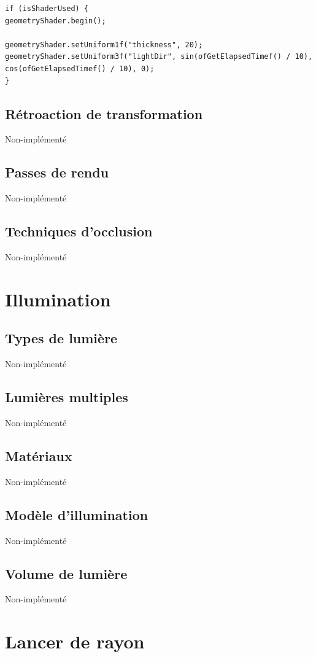 \begin{lstlisting}
if (isShaderUsed) {
geometryShader.begin();

geometryShader.setUniform1f("thickness", 20);
geometryShader.setUniform3f("lightDir", sin(ofGetElapsedTimef() / 10), cos(ofGetElapsedTimef() / 10), 0);
}
\end{lstlisting}

\subsection{Rétroaction de transformation}
Non-implémenté

\subsection{Passes de rendu}
Non-implémenté

\subsection{Techniques d'occlusion}
Non-implémenté


\pagebreak
\section{Illumination}
\subsection{Types de lumière}
Non-implémenté

\subsection{Lumières multiples}
Non-implémenté

\subsection{Matériaux}
Non-implémenté

\subsection{Modèle d'illumination}
Non-implémenté

\subsection{Volume de lumière}
Non-implémenté


\pagebreak
\section{Lancer de rayon}
